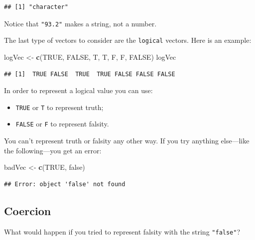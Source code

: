 \documentclass[]{book}
\makeatletter
\newenvironment{Shaded}{\begin{snugshade}}{\end{snugshade}}
\newcommand{\KeywordTok}[1]{\textcolor[rgb]{0.13,0.29,0.53}{\textbf{{#1}}}}
\newcommand{\StringTok}[1]{\textcolor[rgb]{0.31,0.60,0.02}{{#1}}}
\newcommand{\OtherTok}[1]{\textcolor[rgb]{0.56,0.35,0.01}{{#1}}}
\newcommand{\NormalTok}[1]{{#1}}
\providecommand{\tightlist}{%
  \setlength{\itemsep}{0pt}\setlength{\parskip}{0pt}}
\newenvironment{kframe}{%
\medskip{}
\setlength{\fboxsep}{.8em}
 \def\at@end@of@kframe{}%
 \ifinner\ifhmode%
  \def\at@end@of@kframe{\end{minipage}}%
  \begin{minipage}{\columnwidth}%
 \fi\fi%
 \def\FrameCommand##1{\hskip\@totalleftmargin \hskip-\fboxsep
 \colorbox{shadecolor}{##1}\hskip-\fboxsep
     \hskip-\linewidth \hskip-\@totalleftmargin \hskip\columnwidth}%
 \MakeFramed {\advance\hsize-\width
   \@totalleftmargin\z@ \linewidth\hsize
   \@setminipage}}%
 {\par\unskip\endMakeFramed%
 \at@end@of@kframe}
\renewenvironment{Shaded}{\begin{kframe}}{\end{kframe}}
\theoremstyle{definition}
\theoremstyle{definition}
\theoremstyle{remark}
\makeatother
\begin{document}
\begin{verbatim}
## [1] "character"
\end{verbatim}

Notice that \texttt{"93.2"} makes a string, not a number.

The last type of vectors to consider are the
\texttt{logical} vectors. Here is an example:

\begin{Shaded}
\begin{Highlighting}[]
\NormalTok{logVec <-}\StringTok{ }\KeywordTok{c}\NormalTok{(}\OtherTok{TRUE}\NormalTok{, }\OtherTok{FALSE}\NormalTok{, T, T, F, F, }\OtherTok{FALSE}\NormalTok{)}
\NormalTok{logVec}
\end{Highlighting}
\end{Shaded}

\begin{verbatim}
## [1]  TRUE FALSE  TRUE  TRUE FALSE FALSE FALSE
\end{verbatim}

In order to represent a logical value you can use:

\begin{itemize}
\tightlist
\item
  \texttt{TRUE} or \texttt{T} to represent truth;
\item
  \texttt{FALSE} or \texttt{F} to represent falsity.
\end{itemize}

You can't represent truth or falsity any other way. If you try anything
else---like the following---you get an error:

\begin{Shaded}
\begin{Highlighting}[]
\NormalTok{badVec <-}\StringTok{ }\KeywordTok{c}\NormalTok{(}\OtherTok{TRUE}\NormalTok{, false)}
\end{Highlighting}
\end{Shaded}

\begin{verbatim}
## Error: object 'false' not found
\end{verbatim}

\subsection{Coercion}\label{coercion}

What would happen if you tried to represent falsity with the string
\texttt{"false"}?
\end{document}
